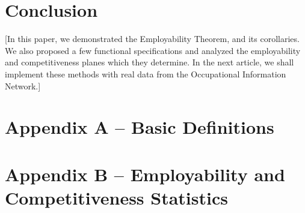 \documentclass[hidelinks, nonatbib]{elsarticle}
\begin{document}

\section{Conclusion}
[In this paper, we demonstrated the Employability Theorem, and its corollaries. We also proposed a few functional specifications and analyzed the employability and competitiveness planes which they determine. In the next article, we shall implement these methods with real data from the Occupational Information Network.]


\newpage
\printbibliography[
    heading=bibintoc,
    title={References}
]


\newpage
\section*{Appendix A -- Basic Definitions}

\section*{Appendix B -- Employability and Competitiveness Statistics}

\end{document}

